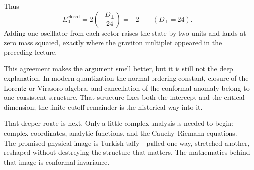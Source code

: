 \begin{classroomqa}
\end{classroomqa}

Thus
\begin{equation}
  E_0^{\mathrm{closed}}
  =
  2\left(-\frac{D_\perp}{24}\right)
  =-2
  \qquad (D_\perp=24).
\end{equation}
Adding one oscillator from each sector raises the state by two units and
lands at zero mass squared, exactly where the graviton multiplet appeared in
the preceding lecture.

This agreement makes the argument smell better, but it is still not the deep
explanation. In modern quantization the normal-ordering constant, closure of
the Lorentz or Virasoro algebra, and cancellation of the conformal anomaly
belong to one consistent structure. That structure fixes both the intercept
and the critical dimension; the finite cutoff remainder is the historical
way into it.

That deeper route is next. Only a little complex analysis is needed to begin:
complex coordinates, analytic functions, and the Cauchy--Riemann equations.
The promised physical image is Turkish taffy---pulled one way, stretched
another, reshaped without destroying the structure that matters. The
mathematics behind that image is conformal invariance.
